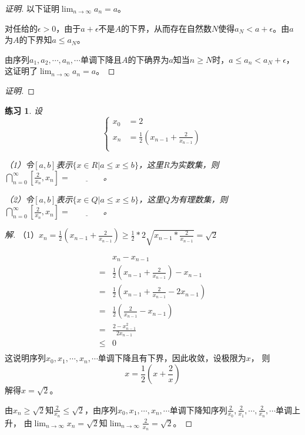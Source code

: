 \documentclass{book}[oneside]
\newtheorem{Exercise}{练习}[chapter]
\begin{document}
\begin{CJK*}{UTF8}{gbsn}
\begin{proof}[证明]
    以下证明$\lim_{n\to \infty}a_n=a$。
  
    对任给的$\epsilon>0$，由于$a+\epsilon$不是$A$的下界，从而存在自然数$N$使得$a_N<a+\epsilon$。由$a$为$A$的下界知$a\leq a_N$。
  
    由序列$a_1,a_2,\cdots,a_n,\cdots$单调下降且$A$的下确界为$a$知当$n\geq N$时，$a\leq a_n < a_N + \epsilon$，这证明了$\lim_{n\to \infty}a_n=a$。
  \end{proof}
  \begin{proof}[证明]
  \end{proof}
  \begin{Exercise}
    设\[
    \begin{cases}
      x_0&=2\\
      x_n&=\frac{1}{2}(x_{n-1}+\frac{2}{x_{n-1}})\\
    \end{cases}
    \]
  
  （1）令$[a,b]$表示$\{x\in R|a\leq x \leq b\}$，这里$R$为实数集，则$\bigcap_{n=0}^{\infty}[\frac{2}{x_n},x_n]=\underline{\quad\quad\quad\quad}$。
  
  （2）令$[a,b]$表示$\{x\in Q|a\leq x \leq b\}$，这里$Q$为有理数集，则$\bigcap_{n=0}^{\infty}[\frac{2}{x_n},x_n]=\underline{\quad\quad\quad\quad}$。
  \end{Exercise}
  \begin{proof}[解]
    （1）$x_n=\frac{1}{2}(x_{n-1}+\frac{2}{x_{n-1}})\geq \frac{1}{2}*2\sqrt{x_{n-1}*\frac{2}{x_{n-1}}}=\sqrt{2}$
  
    \begin{align*}
      &x_n-x_{n-1}\\
      =&\frac{1}{2}(x_{n-1}+\frac{2}{x_{n-1}})-x_{n-1}\\
      =&\frac{1}{2}(x_{n-1}+\frac{2}{x_{n-1}}-2x_{n-1})\\
      =&\frac{1}{2}(\frac{2}{x_{n-1}}-x_{n-1})\\
      =&\frac{2-x_{n-1}^2}{2x_{n-1}}\\
      \leq& 0\\
    \end{align*}
    这说明序列$x_0,x_1,\cdots,x_n,\cdots$单调下降且有下界，因此收敛，设极限为$x$，
    则\[x=\frac{1}{2}(x+\frac{2}{x})\]
    解得$x=\sqrt{2}$。
  
    由$x_n\geq \sqrt{2}$知$\frac{2}{x_n}\leq \sqrt{2}$，由序列$x_0,x_1,\cdots,x_n,\cdots$单调下降知序列$\frac{2}{x_0},\frac{2}{x_1},\cdots,\frac{2}{x_n},\cdots$单调上升，
  由$\lim_{n\to \infty}x_n=\sqrt{2}$知$\lim_{n\to \infty}\frac{2}{x_{n}}=\sqrt{2}$。
  

\end{proof}
\end{CJK*}
\end{document}

